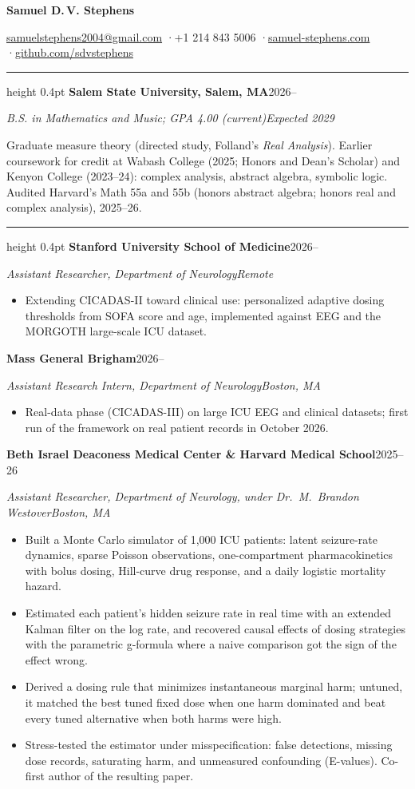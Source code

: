 \documentclass[11pt,letterpaper]{article}
\newcommand{\sect}[1]{\vspace{4pt}{\headingfont\small\MakeUppercase{#1}}\par\vspace{1pt}\hrule height 0.4pt\vspace{3pt}}
\newcommand{\entry}[2]{\textbf{#1}\hfill #2\par}
\newcommand{\role}[2]{\textit{#1}\hfill\textit{#2}\par}
\begin{document}
{\centering
{\fontsize{22}{24}\selectfont\bfseries Samuel D.\,V. Stephens}\par\vspace{3pt}
\href{mailto:samuelstephens2004@gmail.com}{samuelstephens2004@gmail.com}
\enspace·\enspace +1 214 843 5006
\enspace·\enspace \href{https://samuel-stephens.com}{samuel-stephens.com}
\enspace·\enspace \href{https://github.com/sdvstephens}{github.com/sdvstephens}\par}

\sect{Education}
\entry{Salem State University, Salem, MA}{2026--}
\role{B.S. in Mathematics and Music; GPA 4.00 (current)}{Expected 2029}
Graduate measure theory (directed study, Folland's \textit{Real Analysis}). Earlier coursework for credit at Wabash College (2025; Honors and Dean's Scholar) and Kenyon College (2023--24): complex analysis, abstract algebra, symbolic logic. Audited Harvard's Math 55a and 55b (honors abstract algebra; honors real and complex analysis), 2025--26.

\sect{Research Experience}
\entry{Stanford University School of Medicine}{2026--}
\role{Assistant Researcher, Department of Neurology}{Remote}
\begin{itemize}
  \item Extending CICADAS-II toward clinical use: personalized adaptive dosing thresholds from SOFA score and age, implemented against EEG and the MORGOTH large-scale ICU dataset.
\end{itemize}
\entry{Mass General Brigham}{2026--}
\role{Assistant Research Intern, Department of Neurology}{Boston, MA}
\begin{itemize}
  \item Real-data phase (CICADAS-III) on large ICU EEG and clinical datasets; first run of the framework on real patient records in October 2026.
\end{itemize}
\entry{Beth Israel Deaconess Medical Center \& Harvard Medical School}{2025--26}
\role{Assistant Researcher, Department of Neurology, under Dr.~M.~Brandon Westover}{Boston, MA}
\begin{itemize}
  \item Built a Monte Carlo simulator of 1,000 ICU patients: latent seizure-rate dynamics, sparse Poisson observations, one-compartment pharmacokinetics with bolus dosing, Hill-curve drug response, and a daily logistic mortality hazard.
  \item Estimated each patient's hidden seizure rate in real time with an extended Kalman filter on the log rate, and recovered causal effects of dosing strategies with the parametric g-formula where a naive comparison got the sign of the effect wrong.
  \item Derived a dosing rule that minimizes instantaneous marginal harm; untuned, it matched the best tuned fixed dose when one harm dominated and beat every tuned alternative when both harms were high.
  \item Stress-tested the estimator under misspecification: false detections, missing dose records, saturating harm, and unmeasured confounding (E-values). Co-first author of the resulting paper.
\end{itemize}
\end{document}
